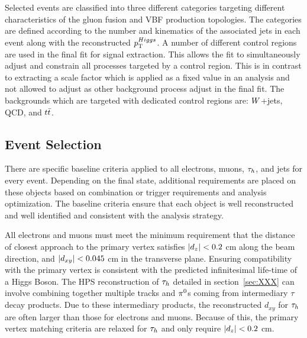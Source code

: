 Selected events are classified into three different categories targeting different characteristics
of the gluon fusion and VBF production topologies.  The categories are defined according to the
number and kinematics of the associated jets in each event along with the reconstructed $p_\mathrm{T}^{Higgs}$.
A number of different control regions are used in the final fit for signal extraction.  This allows
the fit to simultaneously adjust and constrain all processes targeted by a control region.  This is in
contrast to extracting a scale factor which is applied as a fixed value in an analysis and not
allowed to adjust as other background process adjust in the final fit.  The backgrounds which are
targeted with dedicated control regions are: $W$+jets, QCD, and $t\bar{t}$.



\subsection{Event Selection}

There are specific baseline criteria applied to all electrons, muons, $\tau_{h}$, and jets for every
event.  Depending on the final state, additional requirements are placed on these objects based
on combination or trigger requirements and analysis optimization.  The baseline criteria ensure
that each object is well reconstructed and well identified and consistent with the analysis
strategy. 

All electrons and muons must meet the minimum requirement
that the distance of closest approach to the primary vertex satisfies $\lvert d_z\rvert<0.2$ cm
along the beam direction, and $\lvert d_{xy}\rvert<0.045$ cm in the transverse plane. Ensuring
compatibility with the primary vertex is consistent with the predicted infinitesimal life-time of
a Higgs Boson. The HPS reconstruction of $\tau_{h}$ detailed in section~\ref{sec:XXX} can involve
combining together multiple tracks and $\pi^{0}$s coming from intermediary $\tau$ decay products.
Due to these intermediary products, the reconstructed $d_{xy}$ for $\tau_{h}$ are often
larger than those for electrons and muons.  Because of this, the primary vertex matching
criteria are relaxed for $\tau_{h}$ and only require $\lvert d_z\rvert<0.2$ cm.

